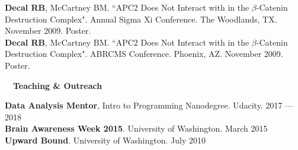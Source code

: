 \documentclass[a4paper,12pt]{article}
\newcommand{\resheading}[1]{{\hspace{-9pt} \colorbox{mygrey}{\begin{minipage}{\textwidth}{\textmd{~~\large \textbf{#1} \vphantom{p\^{E}}}}\end{minipage}}\vspace{6pt}} }
\begin{document}
    \textbf{Decal RB}, McCartney BM. ``APC2 Does Not Interact with in the $\beta$-Catenin Destruction Complex". Annual Sigma Xi Conference. The Woodlands, TX. November 2009. Poster.\\

    \textbf{Decal RB}, McCartney BM. ``APC2 Does Not Interact with in the $\beta$-Catenin Destruction Complex". ABRCMS Conference. Phoenix, AZ. November 2009. Poster.\\
        
\resheading{Teaching \& Outreach}


\textbf{Data Analysis Mentor}, Intro to Programming Nanodegree. Udacity. \hfill 2017 --- 2018\\

        \textbf{Brain Awareness Week 2015}. University of Washington. \hfill  March 2015\\

        \textbf{Upward Bound}. University of Washington. \hfill  July 2010\\
        


\end{document}
